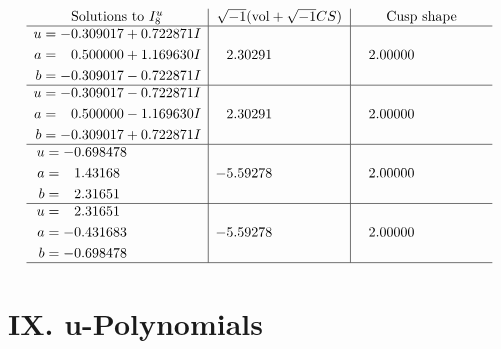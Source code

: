 \documentclass[1p]{elsarticle_modified}
\theoremstyle{definition}
\newcommand{\I}{\sqrt{-1}}
\begin{document}
$$\begin{array}{c|c|c}  
\text{Solutions to }I^u_{8}& \I (\text{vol} + \sqrt{-1}CS) & \text{Cusp shape}\\
 \hline 
\begin{aligned}
u &= -0.309017 + 0.722871 I \\
a &= \phantom{-}0.500000 + 1.169630 I \\
b &= -0.309017 - 0.722871 I\end{aligned}
 & \phantom{-}2.30291\phantom{ +0.000000I} & \phantom{-}2.00000\phantom{ +0.000000I} \\ \hline\begin{aligned}
u &= -0.309017 - 0.722871 I \\
a &= \phantom{-}0.500000 - 1.169630 I \\
b &= -0.309017 + 0.722871 I\end{aligned}
 & \phantom{-}2.30291\phantom{ +0.000000I} & \phantom{-}2.00000\phantom{ +0.000000I} \\ \hline\begin{aligned}
u &= -0.698478\phantom{ +0.000000I} \\
a &= \phantom{-}1.43168\phantom{ +0.000000I} \\
b &= \phantom{-}2.31651\phantom{ +0.000000I}\end{aligned}
 & -5.59278\phantom{ +0.000000I} & \phantom{-}2.00000\phantom{ +0.000000I} \\ \hline\begin{aligned}
u &= \phantom{-}2.31651\phantom{ +0.000000I} \\
a &= -0.431683\phantom{ +0.000000I} \\
b &= -0.698478\phantom{ +0.000000I}\end{aligned}
 & -5.59278\phantom{ +0.000000I} & \phantom{-}2.00000\phantom{ +0.000000I}\\
 \hline 
 \end{array}$$\newpage
\newpage\renewcommand{\arraystretch}{1}
\centering \section*{ IX. u-Polynomials}
\end{document}
